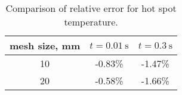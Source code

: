  \begin{table}[H]
    \caption{Comparison of relative error for hot spot temperature.} 
    \vspace{-1.em} 
    \fontsize{10}{10}
    \selectfont 
    \renewcommand{\arraystretch}{1.5}
    \begin{center}
        \begin{tabular}{ ccc }  
        \hline
        mesh size, mm & $t=0.01~\text{s}$ & $t=0.3~\text{s}$ \\
        \hline
        10 & -0.83\% & -1.47\% \\
        20 & -0.58\% & -1.66\% \\
        \hline 
        \end{tabular}
    \end{center}  
     \label{table: 1d_qv_benchmarking_with_insulation_hot_spot_error_conclusion} 
 \end{table}
